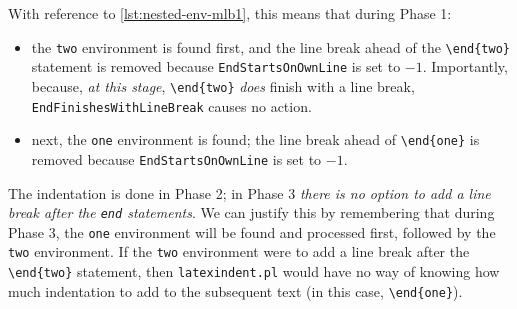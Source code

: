  With reference to \cref{lst:nested-env-mlb1}, this means that during Phase 1:
 \begin{itemize}
  \item the \texttt{two} environment is found first, and the line break ahead of the
        \lstinline!\end{two}! statement is removed because \texttt{EndStartsOnOwnLine} is set to
        $-1$. Importantly, because, \emph{at this stage}, \lstinline!\end{two}! \emph{does}
        finish with a line break, \texttt{EndFinishesWithLineBreak} causes no action.
  \item next, the \texttt{one} environment is found; the line break ahead of
        \lstinline!\end{one}! is removed because \texttt{EndStartsOnOwnLine} is set to $-1$.
 \end{itemize}
 The indentation is done in Phase 2; in Phase 3 \emph{there is no option to add a line
 break after the \lstinline!end! statements}. We can justify this by remembering that
 during Phase 3, the \texttt{one} environment will be found and processed first, followed
 by the \texttt{two} environment. If the \texttt{two} environment were to add a line break
 after the \lstinline!\end{two}! statement, then \texttt{latexindent.pl} would have no way
 of knowing how much indentation to add to the subsequent text (in this case,
 \lstinline!\end{one}!).

